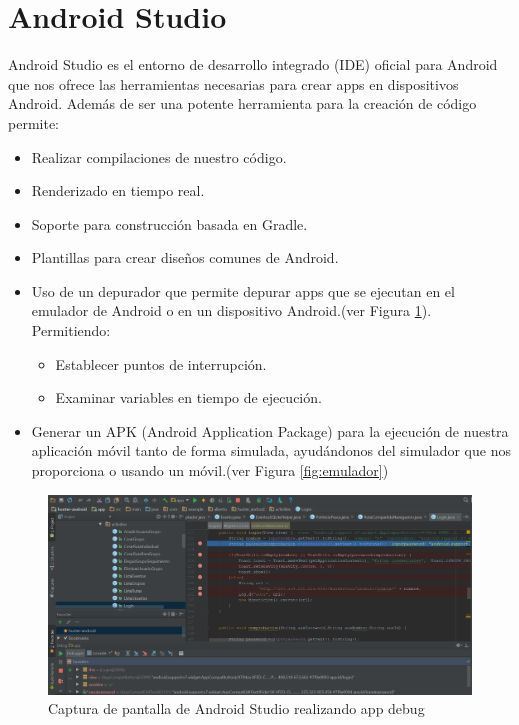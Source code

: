 \section{Android Studio}
Android Studio es el entorno de desarrollo integrado (IDE)  oficial para Android que nos ofrece las herramientas necesarias para crear apps en  dispositivos Android.
Además de ser una potente herramienta para la creación de código permite:

\begin{itemize}
\item Realizar compilaciones  de nuestro código.
\item Renderizado en tiempo real.
\item Soporte para construcción basada en Gradle.
\item Plantillas para crear diseños comunes de Android.
\item Uso de un depurador que permite depurar apps que se ejecutan en el emulador de Android o en un dispositivo Android.(ver Figura \ref{fig:debug}). Permitiendo:\begin{itemize}
\item Establecer puntos de interrupción.
\item Examinar variables en tiempo de ejecución.
\end{itemize}


\item Generar un APK (Android Application Package) para la ejecución de nuestra aplicación móvil tanto de forma simulada, ayudándonos del simulador que nos proporciona o usando un móvil.(ver Figura \ref{fig:emulador})
\end{itemize}
\begin{figure}
		\centering
		\includegraphics[width=\textwidth] {debug.png}
		\caption{Captura de pantalla de Android Studio realizando app debug }\label{fig:debug}
	\end{figure}
